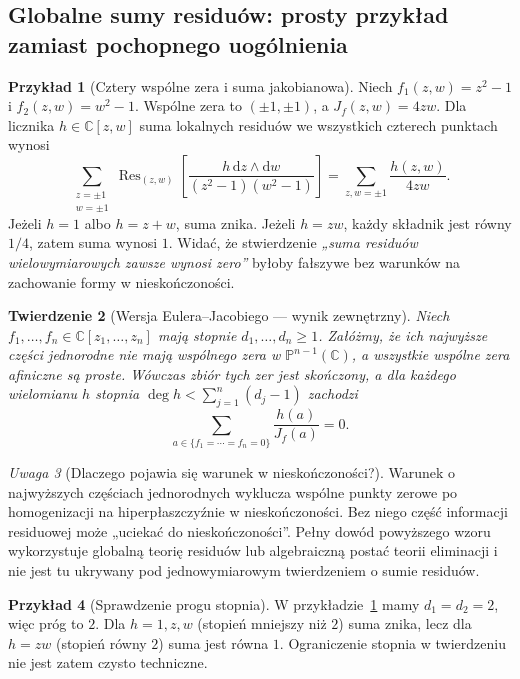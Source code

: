 \documentclass[11pt,a4paper,openany]{report}
\numberwithin{equation}{section}
\theoremstyle{plain}
\newtheorem{twierdzenie}{Twierdzenie}[section]
\theoremstyle{definition}
\newtheorem{przyklad}[twierdzenie]{Przykład}
\theoremstyle{remark}
\newtheorem{uwaga}[twierdzenie]{Uwaga}
\newcommand{\C}{\mathbb C}
\newcommand{\PP}{\mathbb P}
\begin{document}
\subsection{Globalne sumy residuów: prosty przykład zamiast pochopnego uogólnienia}
\label{subsec:ga4-global-multi-res}

\begin{przyklad}[Cztery wspólne zera i suma jakobianowa]
\label{prz:ga4-four-residues}
Niech $f_1(z,w)=z^2-1$ i $f_2(z,w)=w^2-1$.
Wspólne zera to $(\pm1,\pm1)$, a $J_f(z,w)=4zw$.
Dla licznika $h\in\C[z,w]$ suma lokalnych residuów
we wszystkich czterech punktach wynosi
\[
\sum_{\substack{z=\pm1\\w=\pm1}}
\operatorname{Res}_{(z,w)}\!\left[
\frac{h\,\mathrm dz\wedge\mathrm dw}{(z^2-1)(w^2-1)}\right]
=\sum_{z,w=\pm1}\frac{h(z,w)}{4zw}.
\]
Jeżeli $h=1$ albo $h=z+w$, suma znika.
Jeżeli $h=zw$, każdy składnik jest równy $1/4$,
zatem suma wynosi $1$.
Widać, że stwierdzenie \emph{„suma residuów wielowymiarowych
zawsze wynosi zero”} byłoby fałszywe bez warunków
na zachowanie formy w nieskończoności.
\end{przyklad}

\begin{twierdzenie}[Wersja Eulera--Jacobiego — wynik zewnętrzny]
\label{tw:ga4-euler-jacobi}
Niech $f_1,\ldots,f_n\in\C[z_1,\ldots,z_n]$ mają
stopnie $d_1,\ldots,d_n\ge1$. Załóżmy, że ich
najwyższe części jednorodne nie mają wspólnego zera
w $\PP^{n-1}(\C)$, a wszystkie wspólne zera afiniczne
są proste. Wówczas zbiór tych zer jest skończony,
a dla każdego wielomianu $h$ stopnia
$\deg h<\sum_{j=1}^n(d_j-1)$ zachodzi
\[
\sum_{a\in\{f_1=\cdots=f_n=0\}}\frac{h(a)}{J_f(a)}=0.
\]
\end{twierdzenie}

\begin{uwaga}[Dlaczego pojawia się warunek w nieskończoności?]
Warunek o najwyższych częściach jednorodnych wyklucza
wspólne punkty zerowe po homogenizacji na hiperpłaszczyźnie
w nieskończoności. Bez niego część informacji residuowej
może „uciekać do nieskończoności”. Pełny dowód powyższego
wzoru wykorzystuje globalną teorię residuów lub algebraiczną
postać teorii eliminacji i nie jest tu ukrywany pod
jednowymiarowym twierdzeniem o sumie residuów.
\end{uwaga}

\begin{przyklad}[Sprawdzenie progu stopnia]
W przykładzie~\ref{prz:ga4-four-residues} mamy $d_1=d_2=2$,
więc próg to $2$. Dla $h=1,z,w$ (stopień mniejszy niż $2$)
suma znika, lecz dla $h=zw$ (stopień równy $2$)
suma jest równa $1$. Ograniczenie stopnia w twierdzeniu
nie jest zatem czysto techniczne.
\end{przyklad}
\end{document}
